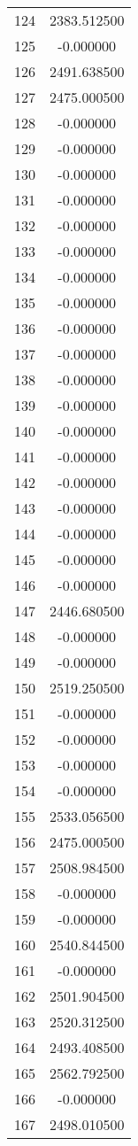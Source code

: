 \documentclass[12pt]{article}
\begin{document}
\begin{longtable}{@{}cc@{}}
124 & 2383.512500 \\
125 & -0.000000 \\
126 & 2491.638500 \\
127 & 2475.000500 \\
128 & -0.000000 \\
129 & -0.000000 \\
130 & -0.000000 \\
131 & -0.000000 \\
132 & -0.000000 \\
133 & -0.000000 \\
134 & -0.000000 \\
135 & -0.000000 \\
136 & -0.000000 \\
137 & -0.000000 \\
138 & -0.000000 \\
139 & -0.000000 \\
140 & -0.000000 \\
141 & -0.000000 \\
142 & -0.000000 \\
143 & -0.000000 \\
144 & -0.000000 \\
145 & -0.000000 \\
146 & -0.000000 \\
147 & 2446.680500 \\
148 & -0.000000 \\
149 & -0.000000 \\
150 & 2519.250500 \\
151 & -0.000000 \\
152 & -0.000000 \\
153 & -0.000000 \\
154 & -0.000000 \\
155 & 2533.056500 \\
156 & 2475.000500 \\
157 & 2508.984500 \\
158 & -0.000000 \\
159 & -0.000000 \\
160 & 2540.844500 \\
161 & -0.000000 \\
162 & 2501.904500 \\
163 & 2520.312500 \\
164 & 2493.408500 \\
165 & 2562.792500 \\
166 & -0.000000 \\
167 & 2498.010500 \\

\end{longtable}
\end{document}
